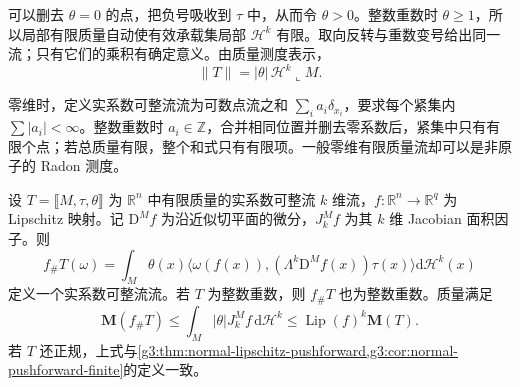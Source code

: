 可以删去 \(\theta=0\) 的点，把负号吸收到 \(\tau\) 中，从而令 \(\theta>0\)。整数重数时 \(\theta\ge1\)，所以局部有限质量自动使有效承载集局部 \(\mathcal H^k\) 有限。取向反转与重数变号给出同一流；只有它们的乘积有确定意义。由质量测度表示，
\begin{equation}\label{g3:eq:rectifiable-current-mass}
	\|T\|=|\theta|\,\mathcal H^k\llcorner M.
\end{equation}

零维时，定义实系数可整流流为可数点流之和 \(\sum_i a_i\delta_{x_i}\)，要求每个紧集内 \(\sum|a_i|<\infty\)。整数重数时 \(a_i\in\mathbb Z\)，合并相同位置并删去零系数后，紧集中只有有限个点；若总质量有限，整个和式只有有限项。一般零维有限质量流却可以是非原子的 Radon 测度。

\begin{proposition}\label{g3:prop:rectifiable-lipschitz-pushforward}
	设 \(T=\lBrack M,\tau,\theta\rBrack\) 为 \(\mathbb R^n\) 中有限质量的实系数可整流 \(k\) 维流，\(f:\mathbb R^n\to\mathbb R^q\) 为 Lipschitz 映射。记 \(\mathrm D^Mf\) 为沿近似切平面的微分，\(J_k^Mf\) 为其 \(k\) 维 Jacobian 面积因子。则
	\begin{equation}\label{g3:eq:rectifiable-pushforward-formula}
		f_\#T(\omega)=\int_M\theta(x)
		\big\langle\omega(f(x)),(\Lambda^k\mathrm D^Mf(x))\tau(x)\big\rangle
		\mathrm d\mathcal H^k(x)
	\end{equation}
	定义一个实系数可整流流。若 \(T\) 为整数重数，则 \(f_\#T\) 也为整数重数。质量满足
	\[
		\mathbf M(f_\#T)\le\int_M|\theta|J_k^Mf\,\mathrm d\mathcal H^k
		\le\operatorname{Lip}(f)^k\mathbf M(T).
	\]
	若 \(T\) 还正规，上式与\cref{g3:thm:normal-lipschitz-pushforward,g3:cor:normal-pushforward-finite}的定义一致。
\end{proposition}
